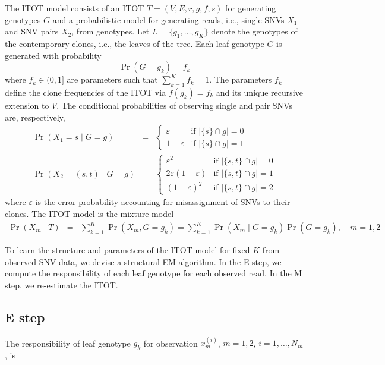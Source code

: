 \documentclass[12pt,a4paper]{amsart}
\newcommand{\eps}{\varepsilon}
\begin{document}
The ITOT model consists of an ITOT $T = (V, E, r, g, f, s)$ for generating genotypes $G$ and a probabilistic model for generating reads, i.e., single SNVs $X_1$ and SNV pairs $X_2$, from genotypes.
Let $L = \{g_1, \dots, g_K\}$ denote the genotypes of the contemporary clones, i.e., the leaves of the tree.
Each leaf genotype $G$ is generated with probability
\begin{equation}
	\Pr(G = g_k) = f_k
\end{equation}
where $f_k \in (0,1]$ are parameters such that $\sum_{k=1}^K f_k = 1$. The parameters $f_k$ define
the clone frequencies of the ITOT via $f(g_k) = f_k$ and its unique recursive extension to $V$.
The conditional probabilities of observing single and pair SNVs are, respectively,
\begin{eqnarray}
	\Pr(X_1 = s \mid G = g) &=&
		\begin{cases}
			\eps   & \text{if $|\{s\} \cap g| = 0$} \\
     		1-\eps & \text{if $|\{s\} \cap g| = 1$}
		\end{cases} \\[1ex]
	\Pr(X_2 = (s,t) \mid G = g) &=&
		\begin{cases}
			\eps^2        & \text{if $|\{s,t\} \cap g| = 0$} \\
     		2\eps(1-\eps) & \text{if $|\{s,t\} \cap g| = 1$} \\
     		(1-\eps)^2    & \text{if $|\{s,t\} \cap g| = 2$}
		\end{cases}
\end{eqnarray}
where $\eps$ is the error probability accounting for misassignment of SNVs to their clones.
The ITOT model is the mixture model
\begin{eqnarray*}
	\Pr(X_m \mid T) &=& \sum_{k=1}^K \Pr(X_m, G = g_k) = \sum_{k=1}^K \Pr(X_m \mid G = g_k) \Pr(G = g_k),
	\quad m=1,2
\end{eqnarray*}

To learn the structure and parameters of the ITOT model for fixed $K$ from
observed SNV data, we devise a structural EM algorithm.
In the E step, we compute the responsibility of each leaf genotype
for each observed read. In the M step, we re-estimate the ITOT.


\subsection{E step}

The responsibility of leaf genotype $g_k$ for observation $x_m^{(i)}$,
$m=1,2$, $i=1,\dots,N_m$, is
\end{document}
